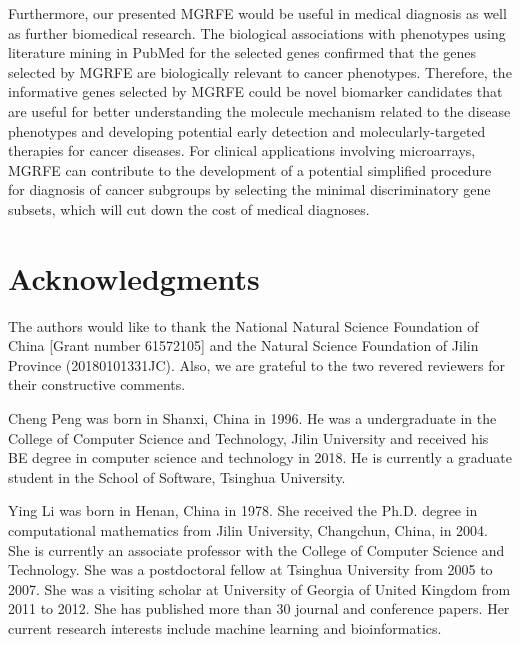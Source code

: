 \documentclass[10pt,journal,compsoc]{IEEEtran}
\begin{document}
	Furthermore, our presented MGRFE would be useful in medical diagnosis as well as further biomedical research. The biological associations with phenotypes using literature mining in PubMed for the selected genes confirmed that the genes selected by MGRFE are biologically relevant to cancer phenotypes. Therefore, the informative genes selected by MGRFE could be novel biomarker candidates that are useful for better understanding the molecule mechanism related to the disease phenotypes and developing potential early detection and molecularly-targeted therapies for cancer diseases. For clinical applications involving microarrays, MGRFE can contribute to the development of a potential simplified procedure for diagnosis of cancer subgroups by selecting the minimal discriminatory gene subsets, which will cut down the cost of medical diagnoses. 


\section*{Acknowledgments}

	The authors would like to thank the National Natural Science Foundation of China [Grant number 61572105] and the Natural Science Foundation of Jilin Province (20180101331JC).
	Also, we are grateful to the two revered reviewers for their constructive comments.




	
\begin{IEEEbiography}{Cheng Peng} 
	was born in Shanxi, China in 1996. He was a undergraduate in the College of Computer Science and Technology, Jilin University and received his BE degree in computer science and technology in 2018. He is currently a graduate student in the School of Software, Tsinghua University.
\end{IEEEbiography}

\begin{IEEEbiography}{Ying Li} 
	was born in Henan, China in 1978. She received the Ph.D. degree in computational mathematics from Jilin University, Changchun, China, in 2004. She is currently an associate professor with the College of Computer Science and Technology. She was a postdoctoral fellow at Tsinghua University from 2005 to 2007. She was a visiting scholar at University of Georgia of United Kingdom from 2011 to 2012. She has published more than 30 journal and conference papers. Her current research interests include machine learning and bioinformatics.
\end{IEEEbiography}
	
\end{document}
